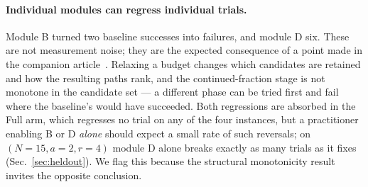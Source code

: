 \paragraph{Individual modules can regress individual trials.} Module B
turned two baseline successes into failures, and module D six. These are
not measurement noise; they are the expected consequence of a point made
in the companion article~\cite{methodpaper}. Relaxing a budget changes which
candidates are retained and how the resulting paths rank, and the
continued-fraction stage is not monotone in the candidate set --- a
different phase can be tried first and fail where the baseline's would
have succeeded. Both regressions are absorbed in the Full arm, which
regresses no trial on any of the four instances, but a practitioner
enabling B or D \emph{alone} should expect a small rate of such
reversals; on $(N{=}15,a{=}2,r{=}4)$ module D alone breaks exactly as
many trials as it fixes (Sec.~\ref{sec:heldout}). We flag this because
the structural monotonicity result invites the opposite conclusion.
